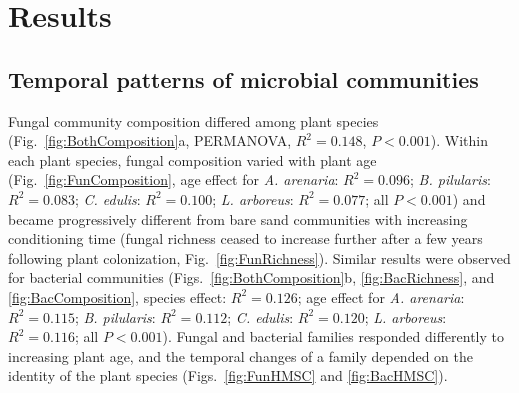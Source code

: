 


\section{Results}
\subsection*{Temporal patterns of microbial communities}
Fungal community composition differed among plant species (Fig.~\ref{fig:BothComposition}a, PERMANOVA, $R^{2}=0.148$, $P<0.001$). Within each plant species, fungal composition varied with plant age (Fig.~\ref{fig:FunComposition}, age effect for \textit{A. arenaria}: $R^{2}=0.096$; \textit{B. pilularis}: $R^{2}=0.083$; \textit{C. edulis}: $R^{2}=0.100$; \textit{L. arboreus}: $R^{2}=0.077$; all $P<0.001$) and became progressively different from bare sand communities with increasing conditioning time (fungal richness ceased to increase further after a few years following plant colonization, Fig.~\ref{fig:FunRichness}).
Similar results were observed for bacterial communities (Figs.~\ref{fig:BothComposition}b, \ref{fig:BacRichness}, and \ref{fig:BacComposition}, species effect: $R^{2}=0.126$; age effect for \textit{A. arenaria}: $R^{2}=0.115$; \textit{B. pilularis}: $R^{2}=0.112$; \textit{C. edulis}: $R^{2}=0.120$; \textit{L. arboreus}: $R^{2}=0.116$; all $P<0.001$). 
Fungal and bacterial families responded differently to increasing plant age, and the temporal changes of a family depended on the identity of the plant species (Figs.~\ref{fig:FunHMSC} and \ref{fig:BacHMSC}). 
\par



